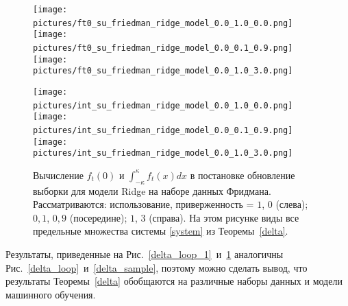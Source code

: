     \begin{figure}
        \centering
        \texttt{[image: pictures/ft0\_su\_friedman\_ridge\_model\_0.0\_1.0\_0.0.png]}~
        \texttt{[image: pictures/ft0\_su\_friedman\_ridge\_model\_0.0\_0.1\_0.9.png]}~
        \texttt{[image: pictures/ft0\_su\_friedman\_ridge\_model\_0.0\_1.0\_3.0.png]}

        \texttt{[image: pictures/int\_su\_friedman\_ridge\_model\_0.0\_1.0\_0.0.png]}~
        \texttt{[image: pictures/int\_su\_friedman\_ridge\_model\_0.0\_0.1\_0.9.png]}~
        \texttt{[image: pictures/int\_su\_friedman\_ridge\_model\_0.0\_1.0\_3.0.png]}
        
        \caption{Вычисление $f_t(0)$ и $\int_{-\kappa}^{\kappa}f_t(x)dx$ в постановке обновление выборки для модели Ridge на наборе данных Фридмана. Рассматриваются: использование, приверженность = $1$, $0$ (слева); $0,1$, $0,9$ (посередине); $1$, $3$ (справа). На этом рисунке виды все предельные множества системы \eqref{system} из Теоремы~\ref{delta}.}
        \label{delta_sample_1}
    \end{figure}

    Результаты, приведенные на Рис.~\ref{delta_loop_1}~и~\ref{delta_sample_1} аналогичны Рис.~\ref{delta_loop}~и~\ref{delta_sample}, поэтому можно сделать вывод, что результаты Теоремы~\ref{delta} обобщаются на различные наборы данных и модели машинного обучения.